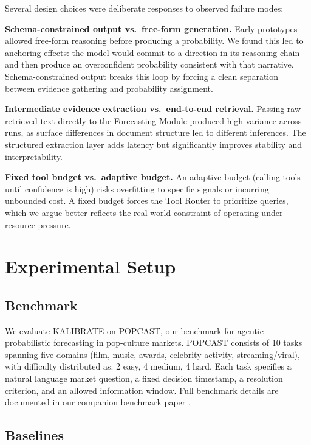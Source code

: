 \documentclass{article} %
\newcommand{\agentname}{KALIBRATE}
\newcommand{\benchmarkname}{POPCAST}
\begin{document}
Several design choices were deliberate responses to observed failure modes:

\textbf{Schema-constrained output vs.\ free-form generation.} Early prototypes allowed free-form reasoning before producing a probability. We found this led to anchoring effects: the model would commit to a direction in its reasoning chain and then produce an overconfident probability consistent with that narrative. Schema-constrained output breaks this loop by forcing a clean separation between evidence gathering and probability assignment.

\textbf{Intermediate evidence extraction vs.\ end-to-end retrieval.} Passing raw retrieved text directly to the Forecasting Module produced high variance across runs, as surface differences in document structure led to different inferences. The structured extraction layer adds latency but significantly improves stability and interpretability.

\textbf{Fixed tool budget vs.\ adaptive budget.} An adaptive budget (calling tools until confidence is high) risks overfitting to specific signals or incurring unbounded cost. A fixed budget forces the Tool Router to prioritize queries, which we argue better reflects the real-world constraint of operating under resource pressure.

\section{Experimental Setup}
\label{sec:setup}

\subsection{Benchmark}

We evaluate \agentname{} on \benchmarkname{}, our benchmark for agentic probabilistic forecasting in pop-culture markets. \benchmarkname{} consists of 10 tasks spanning five domains (film, music, awards, celebrity activity, streaming/viral), with difficulty distributed as: 2 easy, 4 medium, 4 hard. Each task specifies a natural language market question, a fixed decision timestamp, a resolution criterion, and an allowed information window. Full benchmark details are documented in our companion benchmark paper \citep{popcast2026benchmark}.

\subsection{Baselines}
\end{document}
